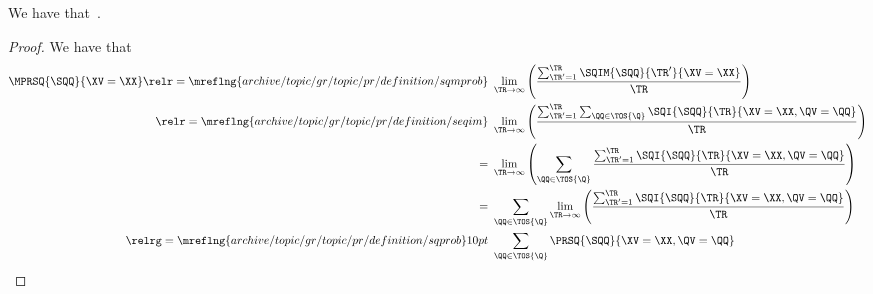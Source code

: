\begin{proposition}
  We have that\ \mprsqexprprop.%
\end{proposition}

\begin{proof}
  We have that
  \begin{align*}
  \MPRSQ{\SQQ}{\XV = \XX}
                    \relr = {\mreflng{archive/topic/gr/topic/pr/definition/sqmprob}} \ & 
                    \lim_{\TR \rightarrow \infty}\left(\frac{\sum_{\TR' = 1}^{\TR}\SQIM{\SQQ}{\TR'}{\XV = \XX}}{\TR}\right)\\
                    \relr = {\mreflng{archive/topic/gr/topic/pr/definition/seqim}} \ & 
                    \lim_{\TR \rightarrow \infty}\left(\frac{\sum_{\TR' = 1}^{\TR}\sum_{\QQ \in \TOS{\Q}} \SQI{\SQQ}{\TR}{\XV = \XX, \QV = \QQ}}{\TR}\right)\\
                    = \ & 
                    \lim_{\TR \rightarrow \infty}\left(\sum_{\QQ \in \TOS{\Q}} \frac{\sum_{\TR' = 1}^{\TR}\SQI{\SQQ}{\TR}{\XV = \XX, \QV = \QQ}}{\TR}\right)\\
                    = \ & 
                    \sum_{\QQ \in \TOS{\Q}} \lim_{\TR \rightarrow \infty}\left(\frac{\sum_{\TR' = 1}^{\TR}\SQI{\SQQ}{\TR}{\XV = \XX, \QV = \QQ}}{\TR}\right)\\
                    \relrg = {\mreflng{archive/topic/gr/topic/pr/definition/sqprob}} 10pt \ & 
                    \sum_{\QQ \in \TOS{\Q}}\PRSQ{\SQQ}{\XV = \XX, \QV = \QQ}
  \end{align*}
\end{proof}
